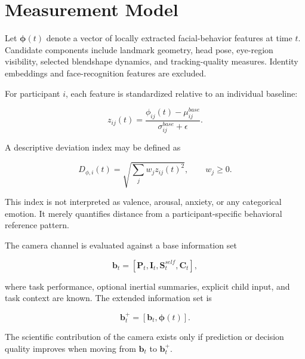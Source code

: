 \section{Measurement Model}

Let \(\boldsymbol{\phi}(t)\) denote a vector of locally extracted facial-behavior features at time \(t\). Candidate components include landmark geometry, head pose, eye-region visibility, selected blendshape dynamics, and tracking-quality measures. Identity embeddings and face-recognition features are excluded.

For participant \(i\), each feature is standardized relative to an individual baseline:

\[
z_{ij}(t)=
\frac{\phi_{ij}(t)-\mu^{base}_{ij}}
{\sigma^{base}_{ij}+\epsilon}.
\]

A descriptive deviation index may be defined as

\[
D_{\phi,i}(t)
=
\sqrt{\sum_j w_j z_{ij}(t)^2},
\qquad w_j \ge 0.
\]

This index is not interpreted as valence, arousal, anxiety, or any categorical emotion. It merely quantifies distance from a participant-specific behavioral reference pattern.

The camera channel is evaluated against a base information set

\[
\mathbf{b}_t =
[
\mathbf{P}_t,
\mathbf{I}_t,
\mathbf{S}^{self}_t,
\mathbf{C}_t
],
\]

where task performance, optional inertial summaries, explicit child input, and task context are known. The extended information set is

\[
\mathbf{b}^{+}_t = [\mathbf{b}_t,\boldsymbol{\phi}(t)].
\]

The scientific contribution of the camera exists only if prediction or decision quality improves when moving from \(\mathbf{b}_t\) to \(\mathbf{b}^{+}_t\).
